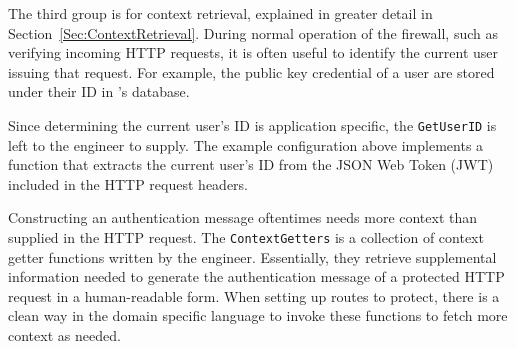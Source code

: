 The third group is for context retrieval, explained in greater detail in Section~\ref{Sec:ContextRetrieval}. During normal operation of the firewall, such as verifying incoming HTTP requests, it is often useful to identify the current user issuing that request. For example, the public key credential of a user are stored under their ID in \sys{}'s database. 

Since determining the current user's ID is application specific, the \lstinline{GetUserID} is left to the engineer to supply. The example configuration above implements a function that extracts the current user's ID from the JSON Web Token (JWT) included in the HTTP request headers.

Constructing an authentication message oftentimes needs more context than supplied in the HTTP request. The \lstinline{ContextGetters} is a collection of context getter functions written by the engineer. Essentially, they retrieve supplemental information needed to generate the authentication message of a protected HTTP request in a human-readable form. When setting up routes to protect, there is a clean way in the domain specific language to invoke these functions to fetch more context as needed.







